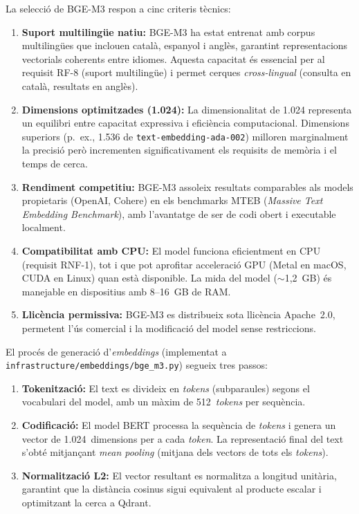 \documentclass[CAT]{TFUOC}%
\begin{document}
La selecció de BGE-M3 respon a cinc criteris tècnics:

\begin{enumerate}
    \item \textbf{Suport multilingüe natiu:} BGE-M3 ha estat entrenat amb corpus multilingües que inclouen català, espanyol i anglès, garantint representacions vectorials coherents entre idiomes. Aquesta capacitat és essencial per al requisit RF-8 (suport multilingüe) i permet cerques \textit{cross-lingual} (consulta en català, resultats en anglès).
    
    \item \textbf{Dimensions optimitzades (1.024):} La dimensionalitat de 1.024 representa un equilibri entre capacitat expressiva i eficiència computacional. Dimensions superiors (p.~ex., 1.536 de \texttt{text-embedding-ada-002}) milloren marginalment la precisió però incrementen significativament els requisits de memòria i el temps de cerca.
    
    \item \textbf{Rendiment competitiu:} BGE-M3 assoleix resultats comparables als models propietaris (OpenAI, Cohere) en els benchmarks MTEB (\textit{Massive Text Embedding Benchmark}), amb l'avantatge de ser de codi obert i executable localment.
    
    \item \textbf{Compatibilitat amb CPU:} El model funciona eficientment en CPU (requisit RNF-1), tot i que pot aprofitar acceleració GPU (Metal en macOS, CUDA en Linux) quan està disponible. La mida del model ($\sim$1,2~GB) és manejable en dispositius amb 8--16~GB de RAM.
    
    \item \textbf{Llicència permissiva:} BGE-M3 es distribueix sota llicència Apache~2.0, permetent l'ús comercial i la modificació del model sense restriccions.
\end{enumerate}

El procés de generació d'\textit{embeddings} (implementat a \texttt{infrastructure/embeddings/bge\_m3.py}) segueix tres passos:

\begin{enumerate}
    \item \textbf{Tokenització:} El text es divideix en \textit{tokens} (subparaules) segons el vocabulari del model, amb un màxim de 512~\textit{tokens} per sequència.
    
    \item \textbf{Codificació:} El model BERT processa la sequència de \textit{tokens} i genera un vector de 1.024~dimensions per a cada \textit{token}. La representació final del text s'obté mitjançant \textit{mean pooling} (mitjana dels vectors de tots els \textit{tokens}).
    
    \item \textbf{Normalització L2:} El vector resultant es normalitza a longitud unitària, garantint que la distància cosinus sigui equivalent al producte escalar i optimitzant la cerca a Qdrant.
\end{enumerate}
\end{document}
